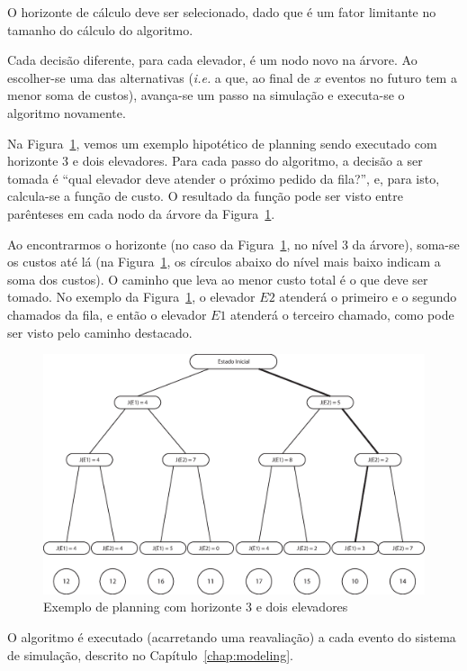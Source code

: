 O horizonte de cálculo deve ser selecionado, dado que é um fator limitante no
tamanho do cálculo do algoritmo.

Cada decisão diferente, para cada elevador, é um nodo novo na árvore. Ao
escolher-se uma das alternativas (\textit{i.e.} a que, ao final de $x$ eventos
no futuro tem a menor soma de custos), avança-se um passo na simulação e executa-se o
algoritmo novamente.

Na Figura~\ref{fig:planning}, vemos um exemplo hipotético de planning sendo executado com
horizonte 3 e dois elevadores. Para cada passo do algoritmo, a decisão a ser
tomada é ``qual elevador deve atender o próximo pedido da fila?'', e, para isto,
calcula-se a função de custo. O resultado da função pode ser visto entre
parênteses em cada nodo da árvore da Figura~\ref{fig:planning}.

Ao encontrarmos o horizonte (no caso da Figura~\ref{fig:planning}, no nível 3 da
árvore), soma-se os custos até lá (na Figura~\ref{fig:planning}, os círculos
abaixo do nível mais baixo indicam a soma dos custos). O caminho que leva ao
menor custo total é o que deve ser tomado. No exemplo da Figura~\ref{fig:planning}, o
elevador $E2$ atenderá o primeiro e o segundo chamados da fila, e então o
elevador $E1$ atenderá o terceiro chamado, como pode ser visto pelo caminho destacado.

\begin{figure}[htb!]
  \centering
  \includegraphics[scale=0.6]{img/planning.eps}
  \caption{Exemplo de planning com horizonte 3 e dois elevadores}
\label{fig:planning}
\end{figure}

O algoritmo é executado (acarretando uma reavaliação) a cada evento do sistema
de simulação, descrito no Capítulo~\ref{chap:modeling}.

